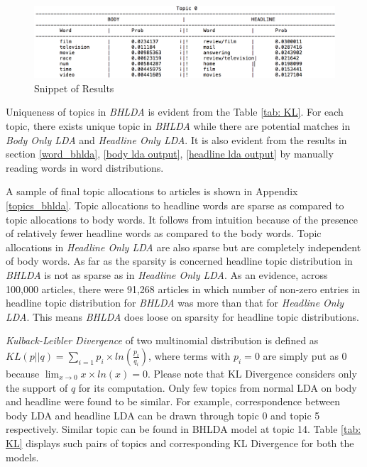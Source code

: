 \documentclass[a4paper]{article}
\begin{document}
\begin{figure}[ht]
		\begin{center}
		\includegraphics[width=\columnwidth]{snippet.jpeg}
		\caption{Snippet of Results}
		\label{fig: snippet}
		\end{center}
\end{figure}

Uniqueness of topics in \emph{BHLDA} is evident from the Table \ref{tab: KL}. For each topic, there exists unique topic in \emph{BHLDA} while there are potential matches in \emph{Body Only LDA} and \emph{Headline Only LDA}. It is also evident from the results in section \ref{word_bhlda}, \ref{body lda output}, \ref{headline lda output}  by manually reading words in word distributions. 

A sample of final topic allocations to articles is shown in Appendix \ref{topics_bhlda}. Topic allocations to headline words are sparse as compared to topic allocations to body words. It follows from intuition because of the presence of relatively fewer headline words as compared to the body words. Topic allocations in \emph{Headline Only LDA} are also sparse but are completely independent of body words. 
As far as the sparsity is concerned headline topic distribution in \emph{BHLDA} is not as sparse as in \emph{Headline Only LDA}. As an evidence, across 100,000 articles, there were 91,268 articles in which number of non-zero entries in headline topic distribution for \emph{BHLDA} was more than that for \emph{Headline Only LDA}. This means \emph{BHLDA} does loose on sparsity for  headline topic distributions.

\emph{Kulback-Leibler Divergence} of two multinomial distribution is defined as 
$KL(p||q) = \sum_{i=1} p_{i} \times ln(\frac{p_{i}}{q_{i}})$, where terms with $p_{i} = 0$ are simply put as 0 because $\lim_{x\to 0}x \times ln(x) = 0$. Please note that KL Divergence considers only the support of $q$ for its computation. Only few topics from normal LDA on body and headline were found to be similar. For example, correspondence between body LDA and headline LDA can be drawn through topic 0 and topic 5 respectively.  Similar topic can be found in BHLDA model at topic 14. Table \ref{tab: KL} displays such pairs of topics and corresponding KL Divergence for both the models. 
\end{document}
